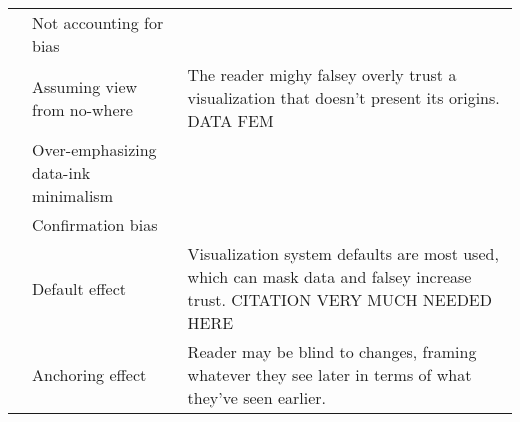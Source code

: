 \begin{table*}[]
\begin{tabular}{c|p{6cm}p{10cm}}
& \rowcolor{colord} Not accounting for bias &  \cite{wall2017warning}\\
& \rowcolor{colord-opaque} Assuming view from no-where & The reader mighy falsey overly trust a visualization that doesn't present its origins. DATA FEM\\
& \rowcolor{colord} Over-emphasizing data-ink minimalism &  \\
& \rowcolor{colord-opaque} Confirmation bias &  \cite{valdez2017framework}\\
& \rowcolor{colord} Default effect & Visualization system defaults are most used, which can mask data and falsey increase trust. CITATION VERY MUCH NEEDED HERE\\
& \rowcolor{colord-opaque} Anchoring effect & Reader may be blind to changes, framing whatever they see later in terms of what they've seen earlier. \cite{ritchie2019lie}\\
\end{tabular}
\end{table*}
